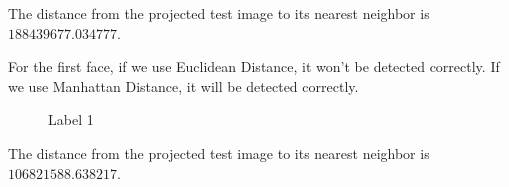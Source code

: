 \documentclass[letterpaper]{polythesis}
\begin{document}
The distance from the projected test image to its nearest neighbor
is $188439677.034777$.

For the first face, if we use Euclidean Distance, it won't be detected correctly.
If we use Manhattan Distance, it will be detected correctly.

\begin{figure}[htbp]
  \centering
\caption{Label 1}
  \label{fig:result 1} %
\end{figure}

The distance from the projected test image to its nearest neighbor
is $106821588.638217$.
\end{document}
